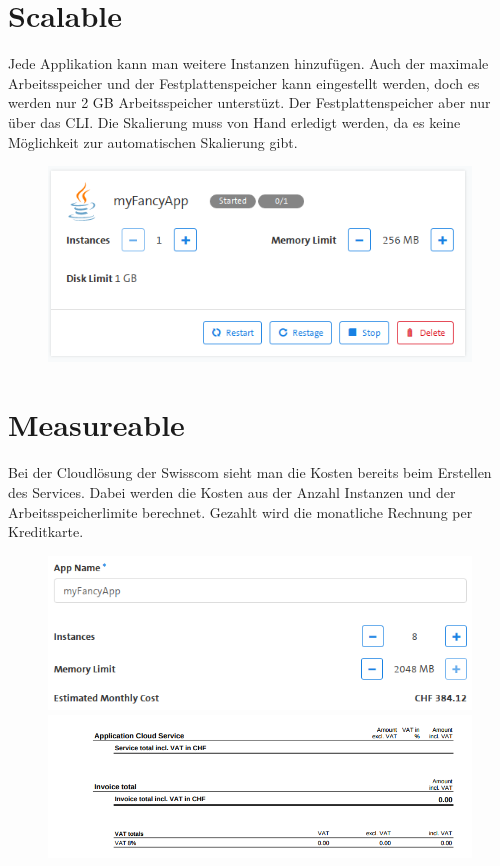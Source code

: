 \section{Scalable}
Jede Applikation kann man weitere Instanzen hinzufügen. Auch der maximale Arbeitsspeicher und der Festplattenspeicher kann eingestellt werden, doch es werden nur 2 GB Arbeitsspeicher unterstüzt. Der Festplattenspeicher aber nur über das CLI. Die Skalierung muss von Hand erledigt werden, da es keine Möglichkeit zur automatischen Skalierung gibt.
\begin{figure}[H]
\centering
\includegraphics[scale=0.5]{images/image09.png} 
\end{figure}

\section{Measureable}
Bei der Cloudlösung der Swisscom sieht man die Kosten bereits beim Erstellen des Services. Dabei werden die Kosten aus der Anzahl Instanzen und der Arbeitsspeicherlimite berechnet. Gezahlt wird die monatliche Rechnung per Kreditkarte.
\begin{figure}[H]
\centering
\includegraphics[scale=0.5]{images/image07.png} 
\includegraphics[scale=0.5]{images/image05.png} 
\end{figure}
